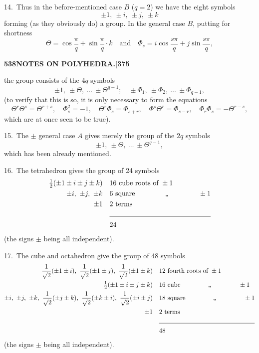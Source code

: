 \documentclass[11pt,a4paper]{article}
\begin{document}
14.~Thus in the before-mentioned case $B$ ($q = 2$) we have the eight symbols
\[
\pm 1,\ \pm i,\ \pm j,\ \pm k
\]
forming (as they obviously do) a group. In the general case $B$, putting for shortness
\[
\Theta = \cos \frac{\pi}{q} + \sin \frac{\pi}{q}\cdot k\quad \text{and}\quad \Phi_{s} = i\cos \frac{s\pi}{q} + j\sin \frac{s\pi}{q},
\]

\newpage
\noindent\textbf{538\hspace{1em}NOTES ON POLYHEDRA.\hfill[375}

\vspace{12pt}

\noindent
the group consists of the $4q$ symbols
\[
\pm 1,\ \pm\Theta,\ \ldots\ \pm\Theta^{q-1};\quad \pm\Phi_{1},\ \pm\Phi_{2},\ \ldots\ \pm\Phi_{q-1},
\]
(to verify that this is so, it is only necessary to form the equations
\[
\Theta^{r}\Theta^{s} = \Theta^{r+s},\quad \Phi_{s}^{2} = -1,\quad \Theta^{r}\Phi_{s} = \Phi_{s+r},\quad \Phi^{s}\Theta^{r} = \Phi_{s-r},\quad \Phi_{r}\Phi_{s} = -\Theta^{r-s},
\]
which are at once seen to be true).

15.~The $\pm$ general case $A$ gives merely the group of the $2q$ symbols
\[
\pm 1,\ \pm\Theta,\ \ldots\ \pm\Theta^{q-1},
\]
which has been already mentioned.

16.~The tetrahedron gives the group of 24 symbols
\begin{align*}
\tfrac{1}{2}(\pm 1 \pm i \pm j \pm k)\quad & 16\ \text{cube roots of } \pm 1\\
\pm i,\ \pm j,\ \pm k\quad & 6\ \text{square \phantom{roots of } ,, \phantom{ roots of }} \pm 1\\
\pm 1\quad & 2\ \text{terms}\\
\cline{2-2}
& 24
\end{align*}
(the signs $\pm$ being all independent).

17.~The cube and octahedron give the group of 48 symbols
\begin{align*}
\frac{1}{\surd 2}(\pm 1 \pm i),\ \frac{1}{\surd 2}(\pm 1 \pm j),\ \frac{1}{\surd 2}(\pm 1 \pm k)\quad & 12\ \text{fourth roots of } \pm 1\\
\tfrac{1}{2}(\pm 1 \pm i \pm j \pm k)\quad & 16\ \text{cube \phantom{roots of } ,, \phantom{ roots of }} \pm 1\\
\pm i,\ \pm j,\ \pm k,\ \frac{1}{\surd 2}(\pm j \pm k),\ \frac{1}{\surd 2}(\pm k \pm i),\ \frac{1}{\surd 2}(\pm i \pm j)\quad & 18\ \text{square \phantom{roots of } ,, \phantom{ roots of }} \pm 1\\
\pm 1\quad & 2\ \text{terms}\\
\cline{2-2}
& 48
\end{align*}
(the signs $\pm$ being all independent).
\end{document}
